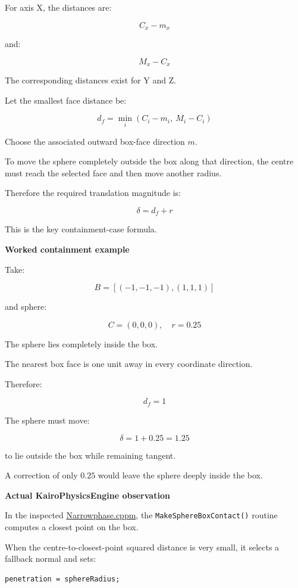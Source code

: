 For axis X, the distances are:

\[
C_x-m_x
\]

and:

\[
M_x-C_x
\]

The corresponding distances exist for Y and Z.

Let the smallest face distance be:

\[
\boxed{ d_f= \min_i(C_i-m_i,\ M_i-C_i) }
\]

Choose the associated outward box-face direction \(m\).

To move the sphere completely outside the box along that direction, the centre must reach the selected face and then move another radius.

Therefore the required translation magnitude is:

\[
\boxed{ \delta=d_f+r }
\]

This is the key containment-case formula.

\textbf{Worked containment example}

Take:

\[
B=[(-1,-1,-1),(1,1,1)]
\]

and sphere:

\[
C=(0,0,0),\quad r=0.25
\]

The sphere lies completely inside the box.

The nearest box face is one unit away in every coordinate direction.

Therefore:

\[
d_f=1
\]

The sphere must move:

\[
\boxed{\delta=1+0.25=1.25}
\]

to lie outside the box while remaining tangent.

A correction of only \(0.25\) would leave the sphere deeply inside the box.

\textbf{Actual KairoPhysicsEngine observation}

In the inspected \href{https://github.com/swayam8624/KairoPhysicsEngine/blob/main/Narrowphase.cppm?utm_source=chatgpt.com}{Narrowphase.cppm}, the \texttt{MakeSphereBoxContact()} routine computes a closest point on the box.

When the centre-to-closest-point squared distance is very small, it selects a fallback normal and sets:

\begin{verbatim}
penetration = sphereRadius;
\end{verbatim}

